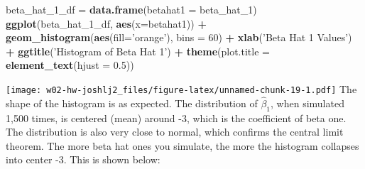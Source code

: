 \documentclass[]{article}
\newenvironment{Shaded}{\begin{snugshade}}{\end{snugshade}}
\newcommand{\KeywordTok}[1]{\textcolor[rgb]{0.13,0.29,0.53}{\textbf{#1}}}
\newcommand{\DataTypeTok}[1]{\textcolor[rgb]{0.13,0.29,0.53}{#1}}
\newcommand{\DecValTok}[1]{\textcolor[rgb]{0.00,0.00,0.81}{#1}}
\newcommand{\FloatTok}[1]{\textcolor[rgb]{0.00,0.00,0.81}{#1}}
\newcommand{\StringTok}[1]{\textcolor[rgb]{0.31,0.60,0.02}{#1}}
\newcommand{\OperatorTok}[1]{\textcolor[rgb]{0.81,0.36,0.00}{\textbf{#1}}}
\newcommand{\NormalTok}[1]{#1}
\begin{document}
\begin{Shaded}
\begin{Highlighting}[]
\NormalTok{beta_hat_1_df =}\StringTok{ }\KeywordTok{data.frame}\NormalTok{(}\DataTypeTok{betahat1 =}\NormalTok{ beta_hat_}\DecValTok{1}\NormalTok{)}
\KeywordTok{ggplot}\NormalTok{(beta_hat_1_df, }\KeywordTok{aes}\NormalTok{(}\DataTypeTok{x=}\NormalTok{betahat1)) }\OperatorTok{+}\StringTok{ }\KeywordTok{geom_histogram}\NormalTok{(}\KeywordTok{aes}\NormalTok{(}\DataTypeTok{fill=}\StringTok{'orange'}\NormalTok{), }\DataTypeTok{bins =} \DecValTok{60}\NormalTok{) }\OperatorTok{+}\StringTok{ }\KeywordTok{xlab}\NormalTok{(}\StringTok{'Beta Hat 1 Values'}\NormalTok{) }\OperatorTok{+}\StringTok{ }\KeywordTok{ggtitle}\NormalTok{(}\StringTok{'Histogram of Beta Hat 1'}\NormalTok{) }\OperatorTok{+}\StringTok{ }\KeywordTok{theme}\NormalTok{(}\DataTypeTok{plot.title =} \KeywordTok{element_text}\NormalTok{(}\DataTypeTok{hjust =} \FloatTok{0.5}\NormalTok{))}
\end{Highlighting}
\end{Shaded}

\texttt{[image: w02-hw-joshlj2\_files/figure-latex/unnamed-chunk-19-1.pdf]}
The shape of the histogram is as expected. The distribution of
\(\hat{\beta}_1\), when simulated 1,500 times, is centered (mean) around
-3, which is the coefficient of beta one. The distribution is also very
close to normal, which confirms the central limit theorem. The more beta
hat ones you simulate, the more the histogram collapses into center -3.
This is shown below:
\end{document}

